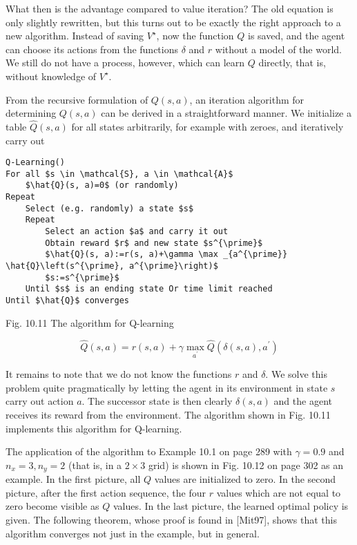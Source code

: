 \documentclass[10pt]{article}
\begin{document}
What then is the advantage compared to value iteration? The old equation is only slightly rewritten, but this turns out to be exactly the right approach to a new algorithm. Instead of saving $V^{\star}$, now the function $Q$ is saved, and the agent can choose its actions from the functions $\delta$ and $r$ without a model of the world. We still do not have a process, however, which can learn $Q$ directly, that is, without knowledge of $V^{\star}$.

From the recursive formulation of $Q(s, a)$, an iteration algorithm for determining $Q(s, a)$ can be derived in a straightforward manner. We initialize a table $\hat{Q}(s, a)$ for all states arbitrarily, for example with zeroes, and iteratively carry out

\begin{verbatim}
Q-Learning()
For all $s \in \mathcal{S}, a \in \mathcal{A}$
    $\hat{Q}(s, a)=0$ (or randomly)
Repeat
    Select (e.g. randomly) a state $s$
    Repeat
        Select an action $a$ and carry it out
        Obtain reward $r$ and new state $s^{\prime}$
        $\hat{Q}(s, a):=r(s, a)+\gamma \max _{a^{\prime}} \hat{Q}\left(s^{\prime}, a^{\prime}\right)$
        $s:=s^{\prime}$
    Until $s$ is an ending state Or time limit reached
Until $\hat{Q}$ converges
\end{verbatim}

Fig. 10.11 The algorithm for Q-learning


\begin{equation*}
\hat{Q}(s, a)=r(s, a)+\gamma \max _{a^{\prime}} \hat{Q}\left(\delta(s, a), a^{\prime}\right) \tag{10.12}
\end{equation*}


It remains to note that we do not know the functions $r$ and $\delta$. We solve this problem quite pragmatically by letting the agent in its environment in state $s$ carry out action $a$. The successor state is then clearly $\delta(s, a)$ and the agent receives its reward from the environment. The algorithm shown in Fig. 10.11 implements this algorithm for Q-learning.

The application of the algorithm to Example 10.1 on page 289 with $\gamma=0.9$ and $n_{x}=3, n_{y}=2$ (that is, in a $2 \times 3$ grid) is shown in Fig. 10.12 on page 302 as an example. In the first picture, all $Q$ values are initialized to zero. In the second picture, after the first action sequence, the four $r$ values which are not equal to zero become visible as $Q$ values. In the last picture, the learned optimal policy is given. The following theorem, whose proof is found in [Mit97], shows that this algorithm converges not just in the example, but in general.
\end{document}
